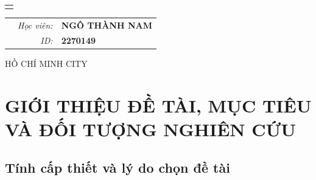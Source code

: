 \documentclass[a4paper,11pt]{article}
\theoremstyle{mytheor}
\begin{document}
\begin{titlepage}
\begin{center}
\begin{tabular}{c}
\\
\\

\end{tabular}
\end{center}

\vspace{1cm}

\begin{table}[h]
\begin{tabular}{rrl}
\hspace{5.6cm} 
&\textit{Học viên: } & \textbf{NGÔ THÀNH NAM}\\
&\textit{ID: } & \textbf{2270149 }\\

\end{tabular}
\end{table}
\vspace{1cm}
\begin{center}
{\footnotesize HỒ CHÍ MINH CITY}
\end{center}
\end{titlepage}




\renewcommand{\contentsname}{Content}
\newpage
\vspace{1cm}
\tableofcontents
\newpage
\section{GIỚI THIỆU ĐỀ TÀI, MỤC TIÊU VÀ ĐỐI TƯỢNG NGHIÊN CỨU}
\subsection{Tính cấp thiết và lý do chọn đề tài}
\end{document}
